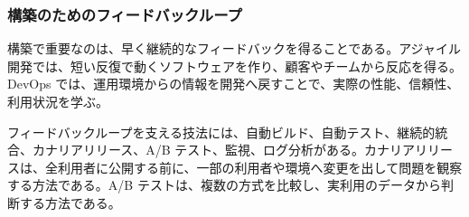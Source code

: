 \subsubsection{構築のためのフィードバックループ}

構築で重要なのは、早く継続的なフィードバックを得ることである。アジャイル開発では、短い反復で動くソフトウェアを作り、顧客やチームから反応を得る。DevOps では、運用環境からの情報を開発へ戻すことで、実際の性能、信頼性、利用状況を学ぶ。

フィードバックループを支える技法には、自動ビルド、自動テスト、継続的統合、カナリアリリース、A/B テスト、監視、ログ分析がある。カナリアリリースは、全利用者に公開する前に、一部の利用者や環境へ変更を出して問題を観察する方法である。A/B テストは、複数の方式を比較し、実利用のデータから判断する方法である。
